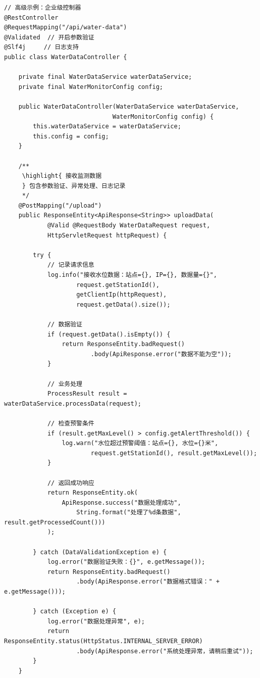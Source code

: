 \begin{lstlisting}[style=java]
// 高级示例：企业级控制器
@RestController
@RequestMapping("/api/water-data")
@Validated  // 开启参数验证
@Slf4j     // 日志支持
public class WaterDataController {
    
    private final WaterDataService waterDataService;
    private final WaterMonitorConfig config;
    
    public WaterDataController(WaterDataService waterDataService,
                              WaterMonitorConfig config) {
        this.waterDataService = waterDataService;
        this.config = config;
    }
    
    /**
     \highlight{ 接收监测数据
     } 包含参数验证、异常处理、日志记录
     */
    @PostMapping("/upload")
    public ResponseEntity<ApiResponse<String>> uploadData(
            @Valid @RequestBody WaterDataRequest request,
            HttpServletRequest httpRequest) {
        
        try {
            // 记录请求信息
            log.info("接收水位数据：站点={}, IP={}, 数据量={}", 
                    request.getStationId(),
                    getClientIp(httpRequest),
                    request.getData().size());
            
            // 数据验证
            if (request.getData().isEmpty()) {
                return ResponseEntity.badRequest()
                        .body(ApiResponse.error("数据不能为空"));
            }
            
            // 业务处理
            ProcessResult result = waterDataService.processData(request);
            
            // 检查预警条件
            if (result.getMaxLevel() > config.getAlertThreshold()) {
                log.warn("水位超过预警阈值：站点={}, 水位={}米", 
                        request.getStationId(), result.getMaxLevel());
            }
            
            // 返回成功响应
            return ResponseEntity.ok(
                ApiResponse.success("数据处理成功", 
                    String.format("处理了%d条数据", result.getProcessedCount()))
            );
            
        } catch (DataValidationException e) {
            log.error("数据验证失败：{}", e.getMessage());
            return ResponseEntity.badRequest()
                    .body(ApiResponse.error("数据格式错误：" + e.getMessage()));
                    
        } catch (Exception e) {
            log.error("数据处理异常", e);
            return ResponseEntity.status(HttpStatus.INTERNAL_SERVER_ERROR)
                    .body(ApiResponse.error("系统处理异常，请稍后重试"));
        }
    }
    

\end{lstlisting}
